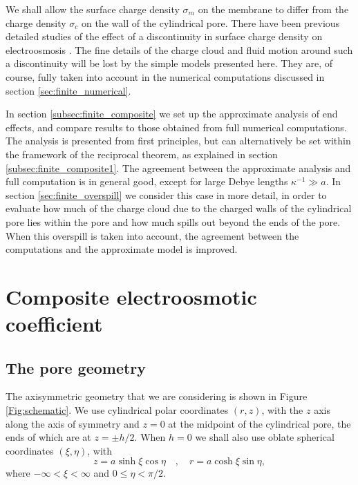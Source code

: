 We shall allow the surface charge density $\sigma_m$ on the membrane to differ from the charge density $\sigma_c$ on the wall of the cylindrical pore. There have been previous detailed studies of the effect of a discontinuity in surface charge density on electroosmosis
\cite{yariv2004,khair2008}. The fine details of the charge cloud and fluid motion around such a discontinuity will be lost by the simple models presented here. They are, of course, fully taken into account in the numerical computations discussed in section \ref{sec:finite_numerical}.

In section \ref{subsec:finite_composite} we set up the approximate analysis of end effects, and compare results to those obtained from full numerical computations. The analysis is presented from first principles, but can alternatively be set within the framework of the reciprocal theorem, as explained in section \ref{subsec:finite_composite1}. The agreement between the approximate analysis and full computation is in general good, except for large Debye lengths $\kappa^{-1}\gg a$. In section \ref{sec:finite_overspill} we consider this case in more detail, in order to evaluate how much of the charge cloud due to the charged walls of the cylindrical pore lies within the pore and how much spills out beyond the ends of the pore. When this overspill is taken into account, the agreement between the computations and the approximate model is improved.

\section{Composite electroosmotic coefficient}
\subsection{The pore geometry}
The axisymmetric geometry that we are considering is shown in Figure \ref{Fig:schematic}. We use cylindrical polar coordinates $(r,z)$, with the $z$ axis along the axis of symmetry and $z=0$ at the midpoint of the cylindrical pore, the ends of which are at $z=\pm h/2$. When $h=0$ we shall also use oblate spherical coordinates $(\xi,\eta)$, with
\begin{equation}
z=a\sinh\xi\cos\eta\quad,\quad r=a\cosh\xi\sin\eta,
\end{equation}
where $-\infty<\xi<\infty$ and $0\le \eta<\pi/2$.


